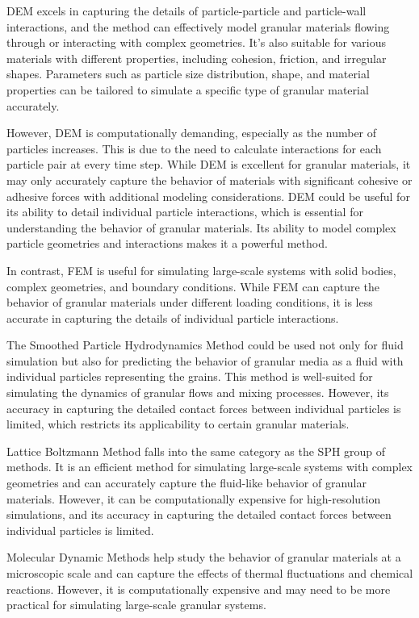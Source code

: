 DEM excels in capturing the details of particle-particle and particle-wall interactions, and the method can effectively model granular materials flowing through or interacting with complex geometries. It's also suitable for various materials with different properties, including cohesion, friction, and irregular shapes. Parameters such as particle size distribution, shape, and material properties can be tailored to simulate a specific type of granular material accurately.

However, DEM is computationally demanding, especially as the number of particles increases. This is due to the need to calculate interactions for each particle pair at every time step. While DEM is excellent for granular materials, it may only accurately capture the behavior of materials with significant cohesive or adhesive forces with additional modeling considerations. DEM could be useful for its ability to detail individual particle interactions, which is essential for understanding the behavior of granular materials. Its ability to model complex particle geometries and interactions makes it a powerful method. 

In contrast, FEM is useful for simulating large-scale systems with solid bodies, complex geometries, and boundary conditions. While FEM can capture the behavior of granular materials under different loading conditions, it is less accurate in capturing the details of individual particle interactions.

The Smoothed Particle Hydrodynamics Method could be used not only for fluid simulation but also for predicting the behavior of granular media as a fluid with individual particles representing the grains. This method is well-suited for simulating the dynamics of granular flows and mixing processes. However, its accuracy in capturing the detailed contact forces between individual particles is limited, which restricts its applicability to certain granular materials.

Lattice Boltzmann Method falls into the same category as the SPH group of methods. It is an efficient method for simulating large-scale systems with complex geometries and can accurately capture the fluid-like behavior of granular materials. However, it can be computationally expensive for high-resolution simulations, and its accuracy in capturing the detailed contact forces between individual particles is limited.

Molecular Dynamic Methods help study the behavior of granular materials at a microscopic scale and can capture the effects of thermal fluctuations and chemical reactions. However, it is computationally expensive and may need to be more practical for simulating large-scale granular systems.

